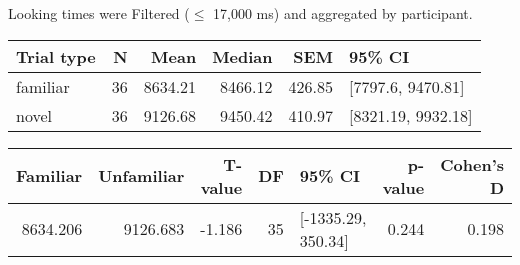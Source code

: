 \begin{appendix}
Looking times were Filtered (\(\leq\) 17,000 ms) and aggregated by
participant.

\begin{tabular}{l|r|r|r|r|l}
\hline
Trial type & N & Mean & Median & SEM & 95\% CI\\
\hline
familiar & 36 & 8634.21 & 8466.12 & 426.85 & [7797.6, 9470.81]\\
\hline
novel & 36 & 9126.68 & 9450.42 & 410.97 & [8321.19, 9932.18]\\
\hline
\end{tabular}

\begin{tabular}{r|r|r|r|l|r|r}
\hline
Familiar & Unfamiliar & T-value & DF & 95\% CI & p-value & Cohen's D\\
\hline
8634.206 & 9126.683 & -1.186 & 35 & [-1335.29, 350.34] & 0.244 & 0.198\\
\hline
\end{tabular}
\end{appendix}
